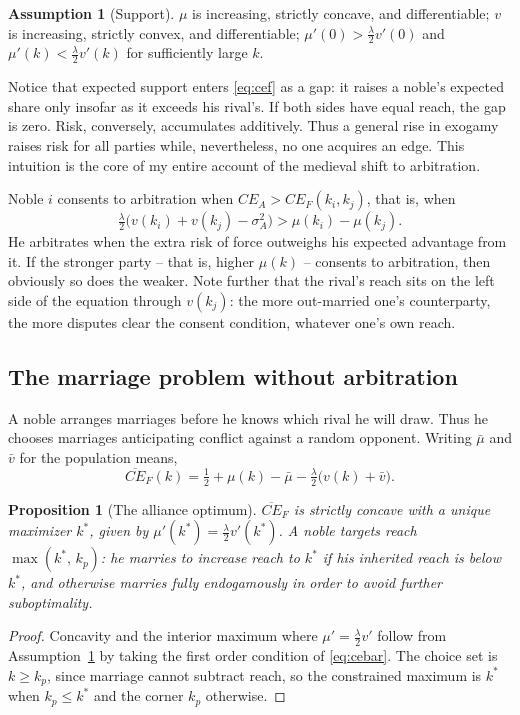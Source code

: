 \documentclass[12pt]{article}
\newtheorem{proposition}{Proposition}
\theoremstyle{definition}
\newtheorem{assumption}{Assumption}
\theoremstyle{remark}
\begin{document}
\begin{assumption}[Support]\label{a:support}
$\mu$ is increasing, strictly concave, and differentiable; $v$ is increasing, strictly convex, and differentiable; $\mu'(0)>\tfrac{\lambda}{2}v'(0)$ and $\mu'(k)<\tfrac{\lambda}{2}v'(k)$ for sufficiently large $k$.
\end{assumption}

Notice that expected support enters \eqref{eq:cef} as a gap: it raises a noble's expected share only insofar as it exceeds his rival's. If both sides have equal reach, the gap is zero. Risk, conversely, accumulates additively. Thus a general rise in exogamy raises risk for all parties while, nevertheless, no one acquires an edge. This intuition is the core of my entire account of the medieval shift to arbitration.

Noble $i$ consents to arbitration when $CE_A>CE_F(k_i,k_j)$, that is, when
\begin{equation}\label{eq:consent}
\tfrac{\lambda}{2}\bigl(v(k_i)+v(k_j)-\sigma^2_A\bigr)>\mu(k_i)-\mu(k_j).
\end{equation}
He arbitrates when the extra risk of force outweighs his expected advantage from it. If the stronger party -- that is, higher $\mu(k)$ -- consents to arbitration, then obviously so does the weaker. Note further that the rival's reach sits on the left side of the equation through $v(k_j)$: the more out-married one's counterparty, the more disputes clear the consent condition, whatever one's own reach.

\subsection{The marriage problem without arbitration}

A noble arranges marriages before he knows which rival he will draw. Thus he chooses marriages anticipating conflict against a random opponent. Writing $\bar\mu$ and $\bar v$ for the population means,
\begin{equation}\label{eq:cebar}
\overline{CE}_F(k)=\tfrac12+\mu(k)-\bar\mu-\tfrac{\lambda}{2}\bigl(v(k)+\bar v\bigr).
\end{equation}

\begin{proposition}[The alliance optimum]\label{p:kstar}
$\overline{CE}_F$ is strictly concave with a unique maximizer $k^\ast$, given by $\mu'(k^\ast)=\tfrac{\lambda}{2}v'(k^\ast)$. A noble targets reach $\max(k^\ast,\,k_p)$: he marries to increase reach to $k^\ast$ if his inherited reach is below $k^*$, and otherwise marries fully endogamously in order to avoid further suboptimality.
\end{proposition}
\begin{proof}
Concavity and the interior maximum where $\mu'=\tfrac{\lambda}{2}v'$ follow from Assumption~\ref{a:support} by taking the first order condition of \eqref{eq:cebar}. The choice set is $k\ge k_p$, since marriage cannot subtract reach, so the constrained maximum is $k^\ast$ when $k_p\le k^\ast$ and the corner $k_p$ otherwise.
\end{proof}
\end{document}
